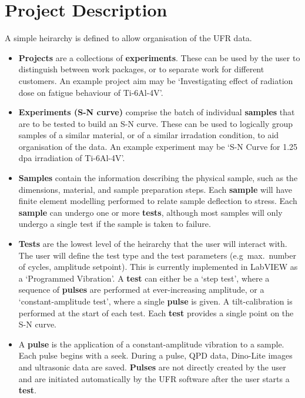 \documentclass[a4paper]{article}
\begin{document}
\section*{Project Description}

A simple heirarchy is defined to allow organisation of the UFR data.


\begin{itemize}
  \item{
    \textbf{Projects} are a collections of \textbf{experiments}.
    These can be used by the user to distinguish between work packages, or to separate work for different customers.
    An example project aim may be `Investigating effect of radiation dose on fatigue behaviour of Ti-6Al-4V'.
  }
  \item{
    \textbf{Experiments (S-N curve)} comprise the batch of individual \textbf{samples} that are to be tested to build an S-N curve.
    These can be used to logically group samples of a similar material, or of a similar irradation condition, to aid organisation of the data.
    An example experiment may be `S-N Curve for 1.25 dpa irradiation of Ti-6Al-4V'.
  }
  \item{
    \textbf{Samples} contain the information describing the physical sample, such as the dimensions, material, and sample preparation steps.
    Each \textbf{sample} will have finite element modelling performed to relate sample deflection to stress.
    Each \textbf{sample} can undergo one or more \textbf{tests}, although most samples will only undergo a single test if the sample is taken to failure.
  }
  \item{
    \textbf{Tests} are the lowest level of the heirarchy that the user will interact with. The user will define the test type and the test parameters (e.g\ max.\ number of cycles, amplitude setpoint).
    This is currently implemented in LabVIEW as a `Programmed Vibration'.
    A \textbf{test} can either be a `step test', where a sequence of \textbf{pulses} are performed at ever-increasing amplitude, or a `constant-amplitude test', where a single \textbf{pulse} is given.
    A tilt-calibration is performed at the start of each test.
    Each \textbf{test} provides a single point on the S-N curve.
  }
  \item{
    A \textbf{pulse} is the application of a constant-amplitude vibration to a sample.
    Each pulse begins with a seek.
    During a pulse, QPD data, Dino-Lite images and ultrasonic data are saved.
    \textbf{Pulses} are not directly created by the user and are initiated automatically by the UFR software after the user starts a \textbf{test}.
  }  
\end{itemize}
\end{document}
